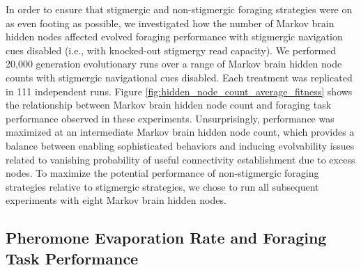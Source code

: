 In order to ensure that stigmergic and non-stigmergic foraging strategies were on as even footing as possible, we investigated how the number of Markov brain hidden nodes affected evolved foraging performance with stigmergic navigation cues disabled (i.e., with knocked-out stigmergy read capacity).
We performed 20,000 generation evolutionary runs over a range of Markov brain hidden node counts with stigmergic navigational cues disabled.
Each treatment was replicated in 111 independent runs.
Figure \ref{fig:hidden_node_count_average_fitness} shows the relationship between Markov brain hidden node count and foraging task performance observed in these experiments.
Unsurprisingly, performance was maximized at an intermediate Markov brain hidden node count, which provides a balance between enabling sophisticated behaviors and inducing evolvability issues related to vanishing probability of useful connectivity establishment due to excess nodes.
To maximize the potential performance of non-stigmergic foraging strategies relative to stigmergic strategies, we chose to run all subsequent experiments with eight Markov brain hidden nodes.

\subsection{Pheromone Evaporation Rate and Foraging Task Performance}



